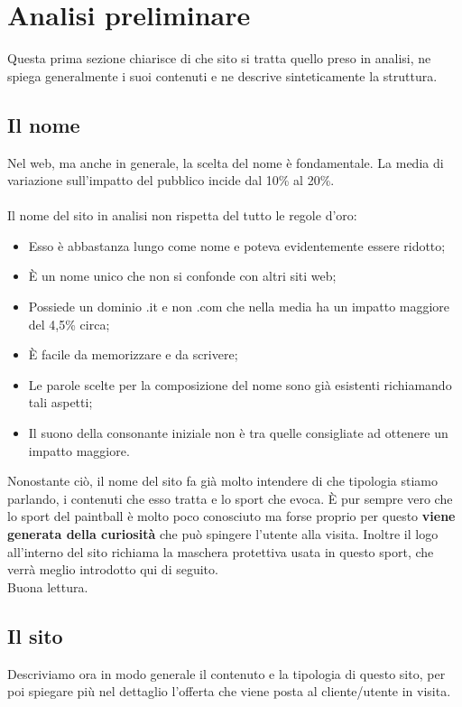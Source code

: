 \documentclass[../Relazione.tex]{subfiles}
\begin{document}
\section{Analisi preliminare}

Questa prima sezione chiarisce di che sito si tratta quello preso in analisi, ne spiega generalmente i suoi contenuti e ne descrive sinteticamente la struttura.

	\subsection{Il nome}
	Nel web, ma anche in generale, la scelta del nome è fondamentale. La media di variazione sull'impatto del pubblico incide dal 10\% al 20\%.\\\\
	Il nome del sito in analisi non rispetta del tutto le regole d'oro: 

	\begin{itemize}
		\item Esso è abbastanza lungo come nome e poteva evidentemente essere ridotto;
		\item È un nome unico che non si confonde con altri siti web;
		\item Possiede un dominio .it e non .com che nella media ha un impatto maggiore del 4,5\% circa;
		\item È facile da memorizzare e da scrivere;
		\item Le parole scelte per la composizione del nome sono già esistenti richiamando tali aspetti;
		\item Il suono della consonante iniziale non è tra quelle consigliate ad ottenere un impatto maggiore.
	\end{itemize}

	Nonostante ciò, il nome del sito fa già molto intendere di che tipologia stiamo parlando, i contenuti che esso tratta e lo sport che evoca.
	È pur sempre vero che lo sport del paintball è molto poco conosciuto ma forse proprio per questo \textbf{viene generata della curiosità} che può spingere l'utente alla visita.
	Inoltre il logo all'interno del sito richiama la maschera protettiva usata in questo sport, che verrà meglio introdotto qui di seguito.\\
	Buona lettura.


\subsection{Il sito}
Descriviamo ora in modo generale il contenuto e la tipologia di questo sito, per poi spiegare più nel dettaglio l'offerta che viene posta al cliente/utente in visita.
\end{document}
